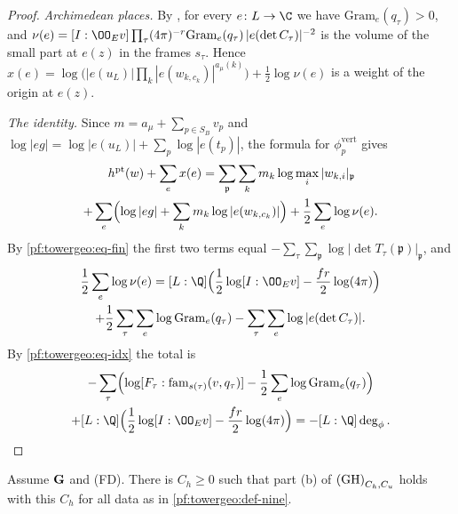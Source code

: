 \begin{proof}
\emph{Archimedean places.} By , for every $e\colon L\to\C$ we
have $\mathrm{Gram}_e(q_\tau)>0$, and
$\nu(e)=[I:\OO_Ev]\prod_\tau(4\pi)^{-r}\mathrm{Gram}_e(q_\tau)\,|e(\det C_\tau)|^{-2}$ is the volume of the small part at
$e(z)$ in the frames $s_\tau$. Hence $x(e)=\log\bigl(|e(u_L)|\prod_k|e(w_{k,c_k})|^{a_\mu(k)}\bigr)+\frac12\log\nu(e)$ is a
weight of the origin at $e(z)$.

\emph{The identity.} Since $m=a_\mu+\sum_{p\in S_B}v_p$ and $\log|eg|=\log|e(u_L)|+\sum_p\log|e(t_p)|$, the formula for
$\phi^{\mathrm{vert}}_p$ gives
\begin{multline*}
[L:\Q]\,h^{\mathrm{pt}}(w)+\sum_ex(e)=\sum_{\mathfrak p}\sum_km_k\log\max_i|w_{k,i}|_{\mathfrak p}\\
+\sum_e\Bigl(\log|eg|+\sum_km_k\log|e(w_{k,c_k})|\Bigr)+\frac12\sum_e\log\nu(e).
\end{multline*}
By \eqref{pf:towergeo:eq-fin} the first two terms equal
$-\sum_\tau\sum_{\mathfrak p}\log|\det T_\tau(\mathfrak p)|_{\mathfrak p}$, and
\begin{multline*}
\frac12\sum_e\log\nu(e)=[L:\Q]\Bigl(\frac12\log[I:\OO_Ev]-\frac{fr}2\log(4\pi)\Bigr)\\
+\frac12\sum_\tau\sum_e\log\mathrm{Gram}_e(q_\tau)-\sum_\tau\sum_e\log|e(\det C_\tau)|.
\end{multline*}
By \eqref{pf:towergeo:eq-idx} the total is
\begin{multline*}
-\sum_\tau\Bigl(\log[F_\tau:\mathrm{fam}_{s(\tau)}(v,q_\tau)]-\frac12\sum_e\log\mathrm{Gram}_e(q_\tau)\Bigr)\\
+[L:\Q]\Bigl(\frac12\log[I:\OO_Ev]-\frac{fr}2\log(4\pi)\Bigr)=-[L:\Q]\deg_\phi.\qedhere
\end{multline*}
\end{proof}

\begin{proposition}\label{pf:towergeo:htU}
Assume $\mathbf G$ and \textup{(FD)}. There is $C_h\ge0$ such that part (b) of $\textup{(GH)}_{C_h,C_u}$
holds with this $C_h$ for all data as in \cref{pf:towergeo:def-nine}.
\end{proposition}


